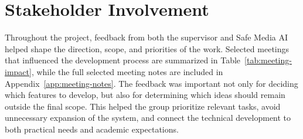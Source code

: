 
\section{Stakeholder Involvement}
\label{sec:stakeholder-involvement-external-feedback}

Throughout the project, feedback from both the supervisor and Safe Media AI helped shape the direction, scope, and priorities of the work. Selected meetings that influenced the development process are summarized in Table~\ref{tab:meeting-impact}, while the full selected meeting notes are included in Appendix~\ref{app:meeting-notes}. The feedback was important not only for deciding which features to develop, but also for determining which ideas should remain outside the final scope. This helped the group prioritize relevant tasks, avoid unnecessary expansion of the system, and connect the technical development to both practical needs and academic expectations.

\begingroup
\scriptsize
\setlength{\tabcolsep}{3pt}
\renewcommand{\arraystretch}{1.08}
\setlength{\LTpre}{0.4em}
\setlength{\LTpost}{0.4em}


